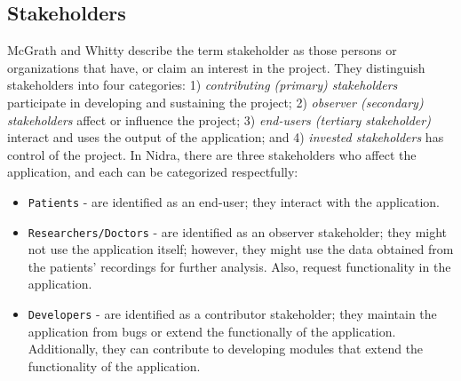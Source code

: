 \subsection{Stakeholders}
McGrath and Whitty \cite{stakeholderdefined} describe the term stakeholder as those persons or organizations that have, or claim an interest in the project. They distinguish stakeholders into four categories: 1) \textit{contributing (primary) stakeholders} participate in developing and sustaining the project; 2) \textit{observer (secondary) stakeholders} affect or influence the project;  3) \textit{end-users (tertiary stakeholder)} interact and uses the output of the application; and 4) \textit{invested stakeholders} has control of the project. In Nidra, there are three stakeholders who affect the application, and each can be categorized respectfully:
\begin{itemize}
    \item \verb|Patients| - are identified as an end-user; they interact with the application.  
    \item \verb|Researchers/Doctors| - are identified as an observer stakeholder; they might not use the application itself; however, they might use the data obtained from the patients' recordings for further analysis. Also, request functionality in the application.
    \item \verb|Developers| - are identified as a contributor stakeholder; they maintain the application from bugs or extend the functionally of the application. Additionally, they can contribute to developing modules that extend the functionality of the application. 
\end{itemize}